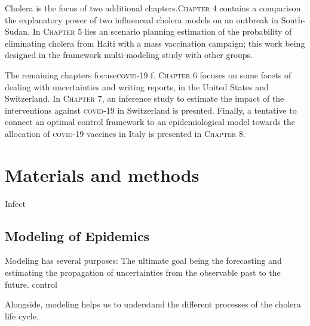 Cholera is the focus of two additional chapters.\textsc{Chapter 4} contains a comparison the explanatory power of two influenceal cholera models on an outbreak in South-Sudan. In \textsc{Chapter 5} lies an scenario planning estimation of the probability of eliminating cholera from Haiti with a mass vaccination campaign; this work being designed in the framework multi-modeling study with other groups.

The remaining chapters focuse\textsc{covid}-19 f. \textsc{Chapter 6} focuses on some facets of dealing with uncertainties and writing reports, in the United States and Switzerland. 
In \textsc{Chapter 7}, an inference study to estimate the impact of the interventions against \textsc{covid}-19 in Switzerland is presnted. 
Finally, a tentative to connect an optimal control framework to an epidemiological model towards the allocation of \textsc{covid}-19 vaccines in Italy is presented in \textsc{Chapter 8}.


\chapter[Materials and methods]{Materials and methods} %

Infect

\section{Modeling of Epidemics}
Modeling has several purposes:
The ultimate goal being  the forecasting and estimating the propagation of uncertainties from the observable past to the future. control

Alongside, modeling helps us to understand the different processes of the cholera life cycle. 


